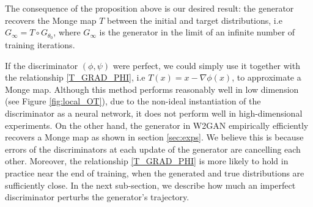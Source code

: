 \documentclass[runningheads]{llncs}
\begin{document}
 The consequence of the proposition above is our desired result: the generator recovers the Monge map $T$ between the initial and target distributions, i.e $G_\infty=T\circ G_{\theta_0}$,  where $G_\infty$ is the generator in the limit of an infinite number of training iterations.
\begin{remark}
\normalfont
If the discriminator $(\phi,\psi)$ were perfect, we could simply use it together with the relationship \eqref{T_GRAD_PHI}, i.e $T(x)=x-\nabla \phi(x)$, to approximate a Monge map. Although this method performs reasonably well in low dimension (see Figure \ref{fig:local_OT}), due to the non-ideal instantiation of the discriminator as a neural network, it does not perform well in high-dimensional experiments. On the other hand, the generator in W2GAN empirically efficiently recovers a Monge map as shown in section \ref{sec:exps}. We believe this is because errors of the discriminators at each update of the generator are cancelling each other. Moreover, the relationship \eqref{T_GRAD_PHI} is more likely to hold in practice near the end of training, when the generated and true distributions are sufficiently close. In the next sub-section, we describe how much an imperfect discriminator perturbs the generator's trajectory.
\end{remark}
\end{document}

